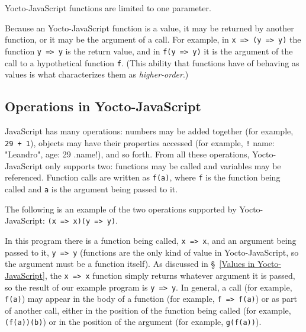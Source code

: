 \documentclass[12pt, oneside]{book}
\begin{document}
Yocto-JavaScript functions are limited to one parameter.

Because an Yocto-JavaScript function is a value, it may be returned by another function, or it may be the argument of a call. For example, in \texttt{x => (y => y)} the function \texttt{y => y} is the return value, and in \texttt{f(y => y)} it is the argument of the call to a hypothetical function \texttt{f}. (This ability that functions have of behaving as values is what characterizes them as \emph{higher-order}.)

\subsection{Operations in Yocto-JavaScript}
\label{Operations in Yocto-JavaScript}

JavaScript has many operations: numbers may be added together (for example, \texttt{29 + 1}), objects may have their properties accessed (for example, \texttt!{ name: "Leandro", age: 29 }.name!), and so forth. From all these operations, Yocto-JavaScript only supports two: functions may be called and variables may be referenced. Function calls are written as \texttt{f(a)}, where \texttt{f} is the function being called and \texttt{a} is the argument being passed to it.

The following is an example of the two operations supported by Yocto-JavaScript: \texttt{(x => x)(y => y)}.

In this program there is a function being called, \texttt{x => x}, and an argument being passed to it, \texttt{y => y} (functions are the only kind of value in Yocto-JavaScript, so the argument must be a function itself). As discussed in §~\ref{Values in Yocto-JavaScript}, the \texttt{x => x} function simply returns whatever argument it is passed, so the result of our example program is \texttt{y => y}. In general, a call (for example, \texttt{f(a)}) may appear in the body of a function (for example, \texttt{f => f(a)}) or as part of another call, either in the position of the function being called (for example, \texttt{(f(a))(b)}) or in the position of the argument (for example, \texttt{g(f(a))}).
\end{document}
